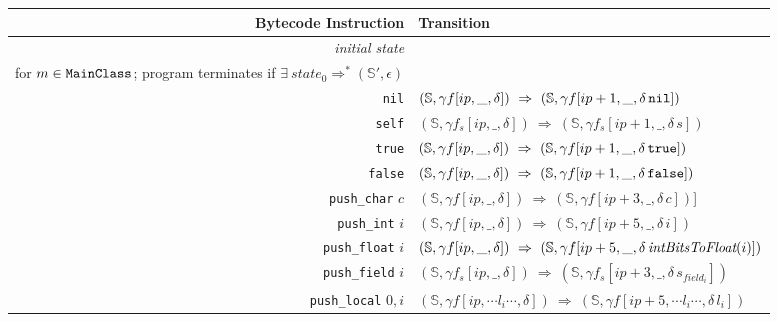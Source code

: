 \documentclass[11pt]{article}
\begin{document}
\begin{figure}
\begin{center}
\begin{tabular}[t]{r | l}
{\bf Bytecode Instruction} & {\bf Transition} \\
\hline
{\em initial state} &
\begin{minipage}[t]{.7\linewidth}
$state_0 = (\mathbb{S}[\text{\tt nil}, \text{\tt true}, \text{\tt false}, \text{\tt Transcript}], \text{\tt main}_{m}[0,\epsilon,\epsilon])$\\
for $m \in \text{\tt MainClass}$; program terminates if $\exists~ state_0 \Rightarrow^* (\mathbb{S'}, \epsilon)$ 
\end{minipage}\\
\hline
{\tt nil}  & $(\mathbb{S}, \gamma f[ip,\_,\delta]) ~\Rightarrow~ (\mathbb{S}, \gamma f[ip+1,\_,\delta\, \text{\tt nil}])$\\

{\tt self} & $(\mathbb{S},\gamma f_s[ip,\_,\delta]) ~\Rightarrow~ (\mathbb{S},\gamma f_s[ip+1,\_,\delta \,s])$ \\

{\tt true} & $(\mathbb{S},\gamma f[ip,\_,\delta]) ~\Rightarrow~ (\mathbb{S},\gamma f[ip+1,\_,\delta \,\text{\tt true}])$\\

{\tt false} & $(\mathbb{S},\gamma f[ip,\_,\delta]) ~\Rightarrow~ (\mathbb{S},\gamma f[ip+1,\_,\delta \,\text{\tt false}])$\\

{\tt push\_char} $c$ & $(\mathbb{S},\gamma f[ip,\_,\delta]) ~\Rightarrow~ (\mathbb{S},\gamma f[ip+3,\_,\delta \,c])$]\\

{\tt push\_int} $i$ & $(\mathbb{S},\gamma f[ip,\_,\delta]) ~\Rightarrow~ (\mathbb{S},\gamma f[ip+5,\_,\delta \,i])$\\

{\tt push\_float} $i$ & $(\mathbb{S},\gamma f[ip,\_,\delta]) ~\Rightarrow~ (\mathbb{S},\gamma f[ip+5,\_,\delta \, \text{\em intBitsToFloat}(i)])$\\

{\tt push\_field} $i$ & $(\mathbb{S},\gamma f_s[ip,\_,\delta]) ~\Rightarrow~ (\mathbb{S}, \gamma f_s[ip+3,\_,\delta \,s_{field_i}])$ \\

{\tt push\_local} $0, i$ & $(\mathbb{S},\gamma f[ip,\cdots l_i \cdots,\delta]) ~\Rightarrow~ (\mathbb{S},\gamma f[ip+5,\cdots l_i\cdots,\delta \,l_i])$\\


\end{tabular}
\end{center}
\end{figure}
\end{document}
